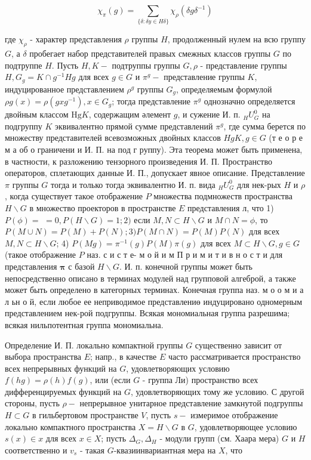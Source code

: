 \documentclass[10pt]{article}
\begin{document}
\[

\chi_{\pi}(g)=\sum_{\{\delta: \delta y \in H \delta\}} \chi_{\rho}\left(\delta g \delta^{-1}\right)

\]



где $\chi_{\rho}$ - характер представления $\rho$ группы $H$, продолженный нулем на всю группу $G$, а $\delta$ пробегает набор представителей правых смежных классов группы $G$ по подтруппе $H$. Пусть $H, K-$ подтруппы группы $G, \rho$ - представление группы $H, G_{g}=K \cap g^{-1} H g$ для всех $g \in G$ и $\pi^{g}-$ представление группы $K$, индуцированное представлением $\rho^{g}$ группы $G_{g}$, определяемым формулой $\rho g(x)=\rho\left(g x g^{-1}\right), x \in G_{g}$; тогда представление $\pi^{g}$ однозначно определяется двойным классом $\mathrm{Hg} K$, содержащим әлемент $g$, и сужение И. п. ${ }_{H} U_{G}^{0}$ на подгруппу $K$ эквивалентно прямой сумме представлений $\pi^{g}$, где сумма берется по множеству представителей всевозможных двойных классов $H g K, g \in G$ (т е о р е м а об о граничени и И. П. на под г руппу). Эта теорема может быть применена, в частности, к разложению тензорного произведения И. П. Пространство операторов, сплетающих данные И. П., допускает явное описание. Представление $\pi$ группы $G$ тогда и только тогда эквивалентно И. п. вида ${ }_{H} U_{G}^{0}$ для нек-рых $H$ и $\rho$, когда существует такое отображение $P$ множества подмножеств пространства $H \backslash G$ в множество проекторов в пространстве $E$ представления л, что 1) $P(\phi)=$ $=0, P(H \backslash G)=1 ; 2)$ если $M, N \subset H \backslash G$ и $M \cap N=\phi$, то $P(M \cup N)=P(M)+P(N) ; 3) P(M \cap N)=P(M) P(N)$ для всех $M, N \subset H \backslash G$; 4) $P(M g)=\pi^{-1}(g) P(M) \pi(g)$ для всех $M \subset H \backslash G, g \in G$ (такое отображение $P$ наз. с и с т е- м о й и м П р и м и т и в н о с т и для представления $\boldsymbol{\pi}$ с базой $H \backslash G$. И. п. конечной группы может быть непосредственно описано в терминах модулей над групповой алгеброй, а также может быть определено в категорных терминах. Конечная группа наз. м о о м и а л ьн о й, если любое ее неприводимое представлениө индуцировано одномерным представлением нек-рой подгруппы. Всякая мономиальная группа разрешима; всякая нильпотентная группа мономиальна.



Определение И. П. локально компактной группы $G$ существенно зависит от выбора пространства $E$; напр., в качестве $E$ часто рассматривается пространство всех непрерывных функций на $G$, удовлетворяющих условию $f(h g)=\rho(h) f(g)$, или (если $G$ - группа Ли) пространство всех дифференцируемых функций на $G$, удовлетворяющих тому же условию. С другой стороны, пусть $\rho-$ непрерывное унитарное представление замкнутой подгруппы $H \subset G$ в гильбертовом пространстве $V$, пусть $s-$ измеримое отображение локально компактного пространства $X=H \backslash G$ в $G$, удовлетворяющее условию $s(x) \in x$ для всех $x \in X$; пусть $\Delta_{G}, \Delta_{H}$ - модули групп (см. Хаара мера) $G$ и $H$ соответственно и $v_{s}$ - такая $G$-квазиинвариантная мера на $X$, что
\end{document}
